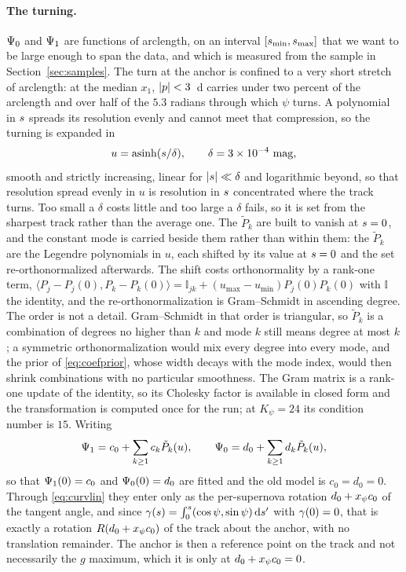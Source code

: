 \documentclass[11pt]{article}
\theoremstyle{plain}
\begin{document}
\paragraph{The turning.} $\Psi_{0}$ and $\Psi_{1}$ are functions of arclength, on an
interval $[s_{\min}, s_{\max}]$ that we want to be large enough to span the data, and
which is measured from the sample in Section~\ref{sec:samples}. The turn at the anchor is
confined to a very short stretch of arclength: at
the median $x_{1}$, $|p| < 3$~d carries under two percent of the arclength and over
half of the $5.3$ radians through which $\psi$ turns. A polynomial in $s$ spreads its resolution evenly and
cannot meet that compression, so the turning is expanded in
\begin{equation}
  u = \operatorname{asinh}(s/\delta), \qquad \delta = 3\times10^{-4}~\mathrm{mag},
  \label{eq:umap}
\end{equation}
smooth and strictly increasing, linear for $|s| \ll \delta$ and logarithmic beyond, so
that resolution spread evenly in $u$ is resolution in $s$ concentrated where the track
turns. Too small a $\delta$ costs little and too large a $\delta$ fails, so it is set from
the sharpest track rather than the average one. The $\tilde P_{k}$ are built to vanish at
$s = 0$, and the constant mode is carried beside them rather than within them: the
$\tilde P_{k}$ are the Legendre polynomials in $u$, each shifted by its
value at $s = 0$ and the set re-orthonormalized afterwards. The shift costs
orthonormality by a rank-one term, $\langle P_{j} - P_{j}(0), P_{k} - P_{k}(0)\rangle
= \mathbb{I}_{jk} + (u_{\max} - u_{\min})P_{j}(0)P_{k}(0)$ with $\mathbb{I}$ the identity,
and the re-orthonormalization is
Gram--Schmidt in ascending degree. The order is not a detail. Gram--Schmidt in that order
is triangular, so $\tilde P_{k}$ is a combination of degrees no higher than $k$ and mode
$k$ still means degree at most $k$; a symmetric orthonormalization would mix every degree
into every mode, and the prior of \eqref{eq:coefprior}, whose width decays with the mode
index, would then shrink combinations with no particular smoothness. The Gram matrix is a
rank-one update of the identity, so its Cholesky factor is available in closed form and the
transformation is computed once for the run; at $K_{\psi} = 24$ its condition number is
$15$. Writing
\begin{equation}
  \Psi_{1} = c_{0} + \sum_{k \geq 1} c_{k}\tilde P_{k}(u), \qquad
  \Psi_{0} = d_{0} + \sum_{k \geq 1} d_{k}\tilde P_{k}(u),
  \label{eq:basispsi}
\end{equation}
so that $\Psi_{1}(0) = c_{0}$ and $\Psi_{0}(0) = d_{0}$ are fitted and the old model is
$c_{0} = d_{0} = 0$. Through \eqref{eq:curvlin} they enter only as the per-supernova
rotation $d_{0} + x_{\psi} c_{0}$ of the tangent angle, and since
$\gamma(s) = \int_{0}^{s}(\cos\psi, \sin\psi)\,\mathrm{d}s'$ with $\gamma(0) = 0$, that
is exactly a rotation $R(d_{0} + x_{\psi} c_{0})$ of the track about the anchor, with no
translation remainder. The anchor is then a reference point on the track and not
necessarily the $g$ maximum, which it is only at $d_{0} + x_{\psi} c_{0} = 0$.
\end{document}
